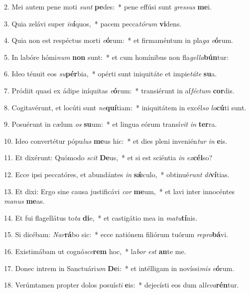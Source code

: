 2. Mei autem pene moti \textit{sunt} \textbf{pe}des:~*  pene effúsi sunt \textit{gres}\textit{sus} \textbf{me}i.\

3. Quia zelávi super \textit{in}\textbf{í}quos,~*  pacem pecca\textit{tó}\textit{rum} \textbf{vi}dens.\

4. Quia non est respéctus morti \textit{e}\textbf{ó}rum:~*  et firmaméntum in pla\textit{ga} \textit{e}\textbf{ó}rum.\

5. In labóre hómi\textit{num} \textbf{non} sunt:~*  et cum homínibus non fla\textit{gel}\textit{la}\textbf{bún}tur:\

6. Ideo ténuit eos \textit{su}\textbf{pér}bia,~*  opérti sunt iniquitáte et impie\textit{tá}\textit{te} \textbf{su}a.\

7. Pródiit quasi ex ádipe iníquitas \textit{e}\textbf{ó}rum:~*  transiérunt in af\textit{féc}\textit{tum} \textbf{cor}dis.\

8. Cogitavérunt, et locúti sunt \textit{ne}\textbf{quí}tiam:~*  iniquitátem in excél\textit{so} \textit{lo}\textbf{cú}ti sunt.\

9. Posuérunt in cælum \textit{os} \textbf{su}um:~*  et lingua eórum transí\textit{vit} \textit{in} \textbf{ter}ra.\

10. Ideo convertétur pópu\textit{lus} \textbf{me}us hic:~*  et dies pleni invenién\textit{tur} \textit{in} \textbf{e}is.\

11. Et dixérunt: Quómodo \textit{scit} \textbf{De}us,~*  et si est sciéntia \textit{in} \textit{ex}\textbf{cél}so?\

12. Ecce ipsi peccatóres, et abundántes \textit{in} \textbf{sǽ}culo,~*  obtinué\textit{runt} \textit{di}\textbf{ví}tias.\

13. Et dixi: Ergo sine causa justificávi \textit{cor} \textbf{me}um,~*  et lavi inter innocéntes \textit{ma}\textit{nus} \textbf{me}as.\

14. Et fui flagellátus to\textit{ta} \textbf{di}e,~*  et castigátio mea in \textit{ma}\textit{tu}\textbf{tí}nis.\

15. Si dicébam: \textit{Nar}\textbf{rá}bo sic:~*  ecce natiónem filiórum tuórum \textit{re}\textit{pro}\textbf{bá}vi.\

16. Existimábam ut cognó\textit{sce}\textbf{rem} hoc,~*  la\textit{bor} \textit{est} \textbf{an}te me.\

17. Donec intrem in Sanctuári\textit{um} \textbf{De}i:~*  et intélligam in novíssi\textit{mis} \textit{e}\textbf{ó}rum.\

18. Verúmtamen propter dolos posuís\textit{ti} \textbf{e}is:~*  dejecísti eos dum al\textit{le}\textit{va}\textbf{rén}tur.\


